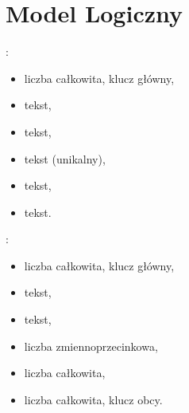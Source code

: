 \documentclass[letterpaper,10pt,english]{sphinxmanual}
\begin{document}
\section{Model Logiczny}
\label{\detokenize{rozdzial3/index:model-logiczny}}
\sphinxAtStartPar
{}:
\begin{itemize}
\item {} 
\sphinxAtStartPar
{} \textendash{} liczba całkowita, klucz główny,

\item {} 
\sphinxAtStartPar
{} \textendash{} tekst,

\item {} 
\sphinxAtStartPar
{} \textendash{} tekst,

\item {} 
\sphinxAtStartPar
{} \textendash{} tekst (unikalny),

\item {} 
\sphinxAtStartPar
{} \textendash{} tekst,

\item {} 
\sphinxAtStartPar
{} \textendash{} tekst.

\end{itemize}

\sphinxAtStartPar
{}:
\begin{itemize}
\item {} 
\sphinxAtStartPar
{} \textendash{} liczba całkowita, klucz główny,

\item {} 
\sphinxAtStartPar
{} \textendash{} tekst,

\item {} 
\sphinxAtStartPar
{} \textendash{} tekst,

\item {} 
\sphinxAtStartPar
{} \textendash{} liczba zmiennoprzecinkowa,

\item {} 
\sphinxAtStartPar
{} \textendash{} liczba całkowita,

\item {} 
\sphinxAtStartPar
{} \textendash{} liczba całkowita, klucz obcy.

\end{itemize}
\end{document}
